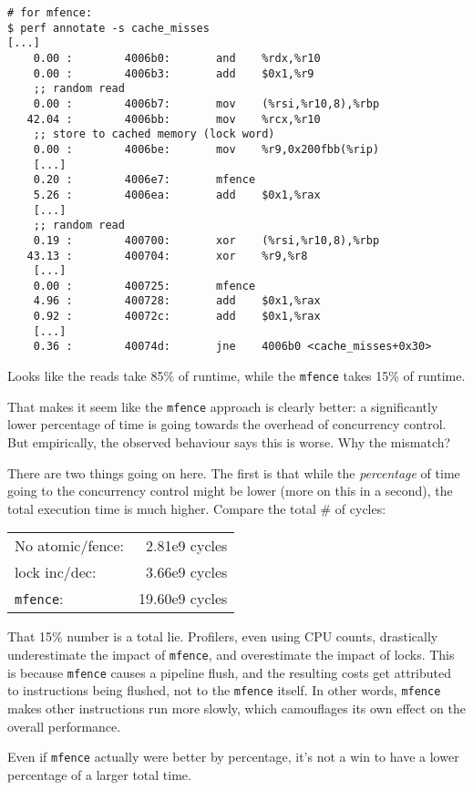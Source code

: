 {\scriptsize
\begin{lstlisting}
# for mfence:
$ perf annotate -s cache_misses
[...]
    0.00 :        4006b0:       and    %rdx,%r10
    0.00 :        4006b3:       add    $0x1,%r9
    ;; random read
    0.00 :        4006b7:       mov    (%rsi,%r10,8),%rbp
   42.04 :        4006bb:       mov    %rcx,%r10
    ;; store to cached memory (lock word)
    0.00 :        4006be:       mov    %r9,0x200fbb(%rip)
    [...]
    0.20 :        4006e7:       mfence 
    5.26 :        4006ea:       add    $0x1,%rax
    [...]
    ;; random read
    0.19 :        400700:       xor    (%rsi,%r10,8),%rbp
   43.13 :        400704:       xor    %r9,%r8
    [...]
    0.00 :        400725:       mfence 
    4.96 :        400728:       add    $0x1,%rax
    0.92 :        40072c:       add    $0x1,%rax
    [...]
    0.36 :        40074d:       jne    4006b0 <cache_misses+0x30>
\end{lstlisting}
}
Looks like the reads take 85\% of runtime,
while the \texttt{mfence} takes 15\% of runtime.

That makes it seem like the \texttt{mfence} approach is clearly better: a significantly lower percentage of time is going towards the overhead of concurrency control. But empirically, the observed behaviour says this is worse. Why the mismatch?

There are two things going on here. The first is that while the \textit{percentage} of time going to the concurrency control might be lower (more on this in a second), the total execution time is much higher. Compare the total \# of cycles:

    \begin{tabular}{lr}
    No atomic/fence:& 2.81e9 cycles\\
    lock inc/dec: & 3.66e9 cycles\\
    \texttt{mfence}: & 19.60e9 cycles
    \end{tabular}

That 15\% number is a total lie.
Profilers, even using CPU counts, drastically underestimate the impact of \texttt{mfence}, and overestimate the impact of locks. This is because \texttt{mfence} causes a pipeline flush, and the resulting 
costs get attributed to instructions being flushed, not to the \texttt{mfence} itself. In other words, \texttt{mfence} makes other instructions run more slowly, which camouflages its own effect on the overall performance.

Even if \texttt{mfence} actually were better by percentage, it's not a win to have a lower percentage of a larger total time.


